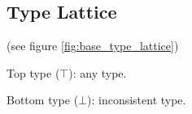 
\subsection{Type Lattice}

 (see figure \ref{fig:base_type_lattice})

Top type ($\top$): any type.

Bottom type ($\bot$): inconsistent type.

